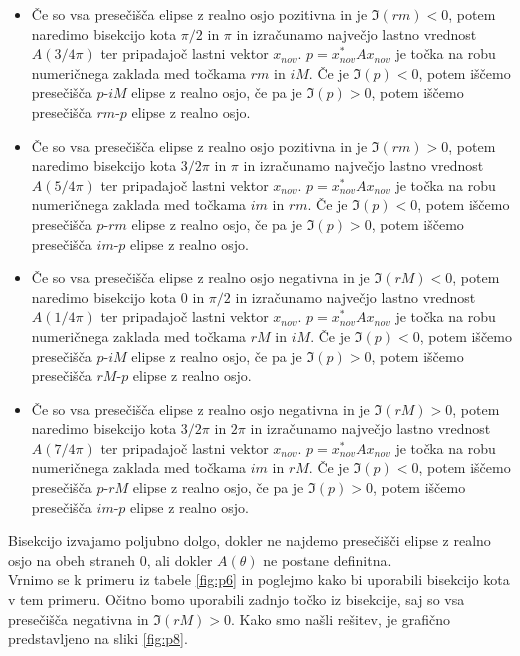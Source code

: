 \documentclass[12pt,a4paper]{amsart}
\theoremstyle{definition}
\theoremstyle{plain}
\begin{document}
\begin{itemize}
\item Če so vsa presečišča elipse z realno osjo pozitivna in je $\Im (rm) <0$, potem naredimo bisekcijo kota $\pi /2$ in $\pi$ in izračunamo največjo lastno vrednost $A(3/4 \pi)$ ter pripadajoč lastni vektor $x_{nov}$. 
$p = x_{nov}^\ast A x_{nov}$ je točka na robu numeričnega zaklada med točkama $rm$ in $iM$. 
Če je $\Im (p) <0$, potem iščemo presečišča $p$-$iM$ elipse z realno osjo, če pa je $\Im (p) >0$, potem iščemo presečišča $rm$-$p$ elipse z realno osjo.

\item Če so vsa presečišča elipse z realno osjo pozitivna in je $\Im (rm) >0$, potem naredimo bisekcijo kota $3/2 \pi$ in $\pi$ in izračunamo največjo lastno vrednost $A(5/4 \pi)$ ter pripadajoč lastni vektor $x_{nov}$. 
$p = x_{nov}^\ast A x_{nov}$ je točka na robu numeričnega zaklada med točkama $im$ in $rm$. 
Če je $\Im (p) <0$, potem iščemo presečišča $p$-$rm$ elipse z realno osjo, če pa je $\Im (p) >0$, potem iščemo presečišča $im$-$p$ elipse z realno osjo.

\item Če so vsa presečišča elipse z realno osjo negativna in je $\Im (rM) <0$, potem naredimo bisekcijo kota $0$ in $\pi /2$ in izračunamo največjo lastno vrednost $A(1/4 \pi)$ ter pripadajoč lastni vektor $x_{nov}$. 
$p = x_{nov}^\ast A x_{nov}$ je točka na robu numeričnega zaklada med točkama $rM$ in $iM$. 
Če je $\Im (p) <0$, potem iščemo presečišča $p$-$iM$ elipse z realno osjo, če pa je $\Im (p) >0$, potem iščemo presečišča $rM$-$p$ elipse z realno osjo.

\item Če so vsa presečišča elipse z realno osjo negativna in je $\Im (rM) >0$, potem naredimo bisekcijo kota $3/2 \pi$ in $2\pi$ in izračunamo največjo lastno vrednost $A(7/4 \pi)$ ter pripadajoč lastni vektor $x_{nov}$. 
$p = x_{nov}^\ast A x_{nov}$ je točka na robu numeričnega zaklada med točkama $im$ in $rM$. 
Če je $\Im (p) <0$, potem iščemo presečišča $p$-$rM$ elipse z realno osjo, če pa je $\Im (p) >0$, potem iščemo presečišča $im$-$p$ elipse z realno osjo.

\end{itemize}

Bisekcijo izvajamo poljubno dolgo, dokler ne najdemo presečišči elipse z realno osjo na obeh straneh 0, ali dokler $A(\theta)$ ne postane definitna.\\

Vrnimo se k primeru iz tabele \ref{fig:p6} in poglejmo kako bi uporabili bisekcijo kota v tem primeru. Očitno bomo uporabili zadnjo točko iz bisekcije, saj so vsa presečišča negativna in $\Im (rM) >0$. 
Kako smo našli rešitev, je grafično predstavljeno na sliki \ref{fig:p8}.
\end{document}
